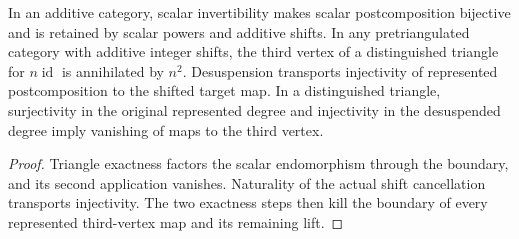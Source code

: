 \begin{proposition}
  \label{prop:scalar-triangle-and-represented-detection}
  \leanok
  In an additive category, scalar invertibility makes scalar postcomposition
  bijective and is retained by scalar powers and additive shifts.
  In any pretriangulated category with additive integer shifts, the third vertex of a distinguished triangle for $n\operatorname{id}$ is annihilated by $n^2$. Desuspension transports injectivity of represented postcomposition to the shifted target map. In a distinguished triangle, surjectivity in the original represented degree and injectivity in the desuspended degree imply vanishing of maps to the third vertex.
\end{proposition}
\begin{proof}
  Triangle exactness factors the scalar endomorphism through the boundary, and its second application vanishes. Naturality of the actual shift cancellation transports injectivity. The two exactness steps then kill the boundary of every represented third-vertex map and its remaining lift.
  \leanok
\end{proof}

